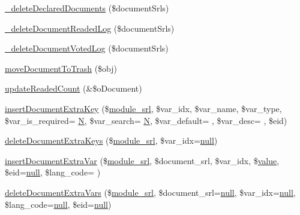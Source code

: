 \begin{DoxyCompactItemize}
\item 
\hyperlink{classdocumentController_a2514acfe313b7ddd5daccb50557d38b5}{\+\_\+delete\+Declared\+Documents} (\$document\+Srls)
\item 
\hyperlink{classdocumentController_ac055fa2cc48de200d0b319eddd7a13da}{\+\_\+delete\+Document\+Readed\+Log} (\$document\+Srls)
\item 
\hyperlink{classdocumentController_a9fe391d1b1ece3b7b16d15976c1622d0}{\+\_\+delete\+Document\+Voted\+Log} (\$document\+Srls)
\item 
\hyperlink{classdocumentController_a3f861f8df6113ca3211c48be3c49f305}{move\+Document\+To\+Trash} (\$obj)
\item 
\hyperlink{classdocumentController_a437461a6588e59e038ed54316bfa7893}{update\+Readed\+Count} (\&\$o\+Document)
\item 
\hyperlink{classdocumentController_a832207dfbf4dac2f32d4a365f9e5ea77}{insert\+Document\+Extra\+Key} (\$\hyperlink{ko_8install_8php_a370bb6450fab1da3e0ed9f484a38b761}{module\+\_\+srl}, \$var\+\_\+idx, \$var\+\_\+name, \$var\+\_\+type, \$var\+\_\+is\+\_\+required= \textquotesingle{}\hyperlink{jquery-1_8x_8min_8js_ab8a5cba0bbaa18ec7f830663874cb9d0}{N}\textquotesingle{}, \$var\+\_\+search= \textquotesingle{}\hyperlink{jquery-1_8x_8min_8js_ab8a5cba0bbaa18ec7f830663874cb9d0}{N}\textquotesingle{}, \$var\+\_\+default= \textquotesingle{}\textquotesingle{}, \$var\+\_\+desc= \textquotesingle{}\textquotesingle{}, \$eid)
\item 
\hyperlink{classdocumentController_a279894a3cef824bc940cda67ced511aa}{delete\+Document\+Extra\+Keys} (\$\hyperlink{ko_8install_8php_a370bb6450fab1da3e0ed9f484a38b761}{module\+\_\+srl}, \$var\+\_\+idx=\hyperlink{modernizr_8min_8js_a286f9ec831c5e676eeb493248eab9575}{null})
\item 
\hyperlink{classdocumentController_adb5345b43e9795d7e647754cb88b9b5a}{insert\+Document\+Extra\+Var} (\$\hyperlink{ko_8install_8php_a370bb6450fab1da3e0ed9f484a38b761}{module\+\_\+srl}, \$document\+\_\+srl, \$var\+\_\+idx, \$\hyperlink{jquery_8js_abe5393d870043cf6aaa1d5ad5fce755c}{value}, \$eid=\hyperlink{modernizr_8min_8js_a286f9ec831c5e676eeb493248eab9575}{null}, \$lang\+\_\+code= \textquotesingle{}\textquotesingle{})
\item 
\hyperlink{classdocumentController_a1ebb5684cf99ea4044fa476c6d006bd2}{delete\+Document\+Extra\+Vars} (\$\hyperlink{ko_8install_8php_a370bb6450fab1da3e0ed9f484a38b761}{module\+\_\+srl}, \$document\+\_\+srl=\hyperlink{modernizr_8min_8js_a286f9ec831c5e676eeb493248eab9575}{null}, \$var\+\_\+idx=\hyperlink{modernizr_8min_8js_a286f9ec831c5e676eeb493248eab9575}{null}, \$lang\+\_\+code=\hyperlink{modernizr_8min_8js_a286f9ec831c5e676eeb493248eab9575}{null}, \$eid=\hyperlink{modernizr_8min_8js_a286f9ec831c5e676eeb493248eab9575}{null})

\end{DoxyCompactItemize}
